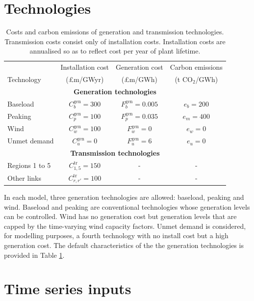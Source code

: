 \documentclass[preprint]{elsarticle}
\begin{document}
\section{Technologies}
\begin{table}
  \centering
\begin{tabular}{ l  c  c  c}
\small
& Installation cost & Generation cost & Carbon emissions\\
Technology &(\pounds m/GWyr) &(\pounds m/GWh) & (t CO$_2$/GWh) \\ \hline
\multicolumn{4}{c}{\textbf{Generation technologies}} \\  
Baseload & $C_b^\text{gen} = 300$ & $F_b^\text{gen} = 0.005$ & $e_b = 200$ \\
Peaking & $C_p^\text{gen} = 100$ & $F_p^\text{gen} = 0.035$ & $e_m = 400$ \\
Wind & $C_w^\text{gen} = 100$ & $F_w^\text{gen} = 0$ & $e_w = 0$ \\
Unmet demand & $C_u^\text{gen} = 0$ & $F_u^\text{gen} = 6$ & $e_u = 0$ \\
\multicolumn{4}{c}{\textbf{Transmission technologies}} \\  
Regions 1 to 5 & $C_{1,5}^\text{tr} = 150$ & - & - \\
Other links & $C_{r,r'}^\text{tr} = 100$ & - & - \\ \hline
\end{tabular} \vspace{1em}
\caption{Costs and carbon emissions of generation and transmission technologies. Transmission costs consist only of installation costs. Installation costs are annualised so as to reflect cost per year of plant lifetime.}
\label{table:tech_characteristics}
\end{table}

\noindent In each model, three generation technologies are allowed: baseload, peaking and wind. Baseload and peaking are conventional technologies whose generation levels can be controlled. Wind has no generation cost but generation levels that are capped by the time-varying wind capacity factors. Unmet demand is considered, for modelling purposes, a fourth technology with no install cost but a high generation cost. The default characteristics of the the generation technologies is provided in Table \ref{table:tech_characteristics}. \\




\section{Time series inputs}
\end{document}
